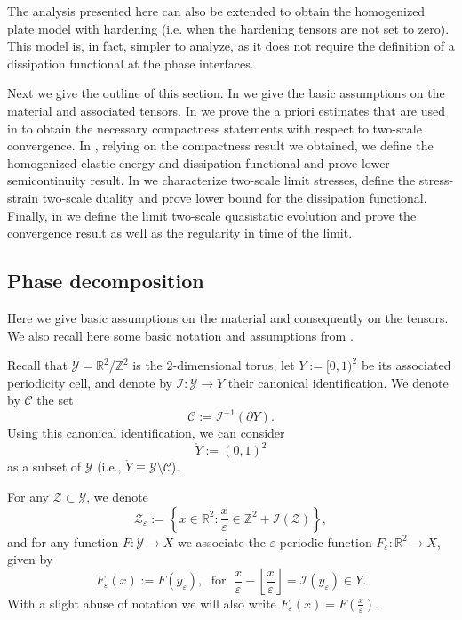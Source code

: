 \documentclass[reqno,10pt]{amsart}
\numberwithin{equation}{section}
\theoremstyle{remark}
\newcommand{\RED}{\color{black}}
\newcommand{\BLACK}{\color{black}}
\newcommand{\PINK}{\color{black}}
\newcommand{\calC}{\mathcal{C}}
\newcommand{\calI}{\mathcal{I}}
\newcommand{\R}{\mathbb{R}}
\newcommand{\calY}{\mathcal{Y}}
\newcommand{\Z}{\mathbb{Z}}
\newcommand{\calZ}{\mathcal{Z}}
\newcommand{\eps}{\varepsilon}
\begin{document}
The analysis presented here can also be {\RED extended\BLACK} to obtain the homogenized plate model with hardening (i.e. when the hardening tensors are not set to zero). 
{\PINK This model is, in fact, simpler to analyze, as it does not require the definition of a dissipation functional at the phase interfaces.\BLACK}

Next we give the outline of this section. 
In  we give the basic assumptions on the material and associated tensors. 
In  we prove the a priori estimates that are used in  to obtain the necessary compactness statements with respect to two-scale convergence. 
In , relying on the compactness result we obtained, we define the homogenized elastic energy and dissipation functional and prove lower semicontinuity result. In  we characterize two-scale limit stresses, define the stress-strain two-scale duality and prove lower bound for the dissipation functional.
Finally, in  we define the limit two-scale quasistatic evolution and prove the convergence result as well as the regularity in time of the limit. 

\subsection{Phase decomposition} \label{section phase decomposition} 

Here we give basic assumptions on the material and consequently on the tensors. 
We also recall here some basic notation and assumptions from \cite{Francfort.Giacomini.2014}. 

Recall that $\calY = \R^2/\Z^2$ is the $2$-dimensional torus, let $Y := [0, 1)^2$ be its associated periodicity cell, and denote by $\calI : \calY \to Y$ their canonical identification.
We denote by $\calC$ the set 
\begin{equation} \label{torus boundary}
	\calC := \calI^{-1}(\partial Y).
\end{equation}
Using this canonical identification, we can consider
\begin{equation} \label{torus without the boundary}
	\mathring{Y} := (0 ,1)^2
\end{equation}
as a subset of $\calY$ (i.e., $\mathring{Y} \equiv \calY \setminus \calC$).

For any $\calZ \subset \calY$, we denote
\begin{equation} \label{periodic set notation}
	\calZ_\eps := \left\{ x \in \R^2 : \frac{x}{\eps} \in \Z^2+\calI(\calZ) \right\},
\end{equation}
and for any function $F : \calY \to X$ we associate the $\eps$-periodic function $F_\eps : \R^2 \to X$, given by
\begin{equation*}
	F_\eps(x) := F\left(y_\eps\right), \;\text{ for }\; \frac{x}{\eps}-\left\lfloor \frac{x}{\eps} \right\rfloor = \calI(y_\eps) \in Y.
\end{equation*}
With a slight abuse of notation we will also write $F_\eps(x) = F\left(\frac{x}{\eps}\right)$.
\end{document}
